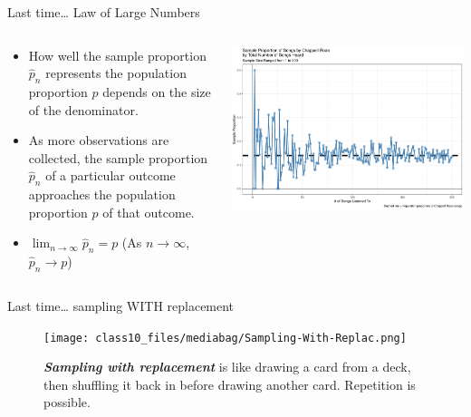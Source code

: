 \documentclass[
  ignorenonframetext,
]{beamer}
\begin{document}
\begin{frame}{Last time\ldots{} Law of Large Numbers}
\label{last-time-law-of-large-numbers}
\begin{columns}[T]
\begin{column}{0.48\textwidth}
\begin{itemize}
\item
  How well the sample proportion \(\hat{p}_n\) represents the population
  proportion \(p\) depends on the size of the denominator.
\item
  As more observations are collected, the sample proportion
  \(\hat{p}_n\) of a particular outcome approaches the population
  proportion \(p\) of that outcome.
\item
  \(\lim_{n\to\infty} \hat{p}_n = p\) (As \(n \to \infty\),
  \(\hat{p}_n \to p\))
\end{itemize}
\end{column}

\begin{column}{0.48\textwidth}
\includegraphics{class10_files/figure-beamer/unnamed-chunk-2-1.pdf}
\end{column}
\end{columns}
\end{frame}

\begin{frame}{Last time\ldots{} sampling WITH replacement}
\label{last-time-sampling-with-replacement}
\begin{figure}[H]

{\centering \texttt{[image: class10\_files/mediabag/Sampling-With-Replac.png]}

}

\caption{\textbf{\emph{Sampling with replacement}} is like drawing a
card from a deck, then shuffling it back in before drawing another card.
Repetition is possible.}

\end{figure}%
\end{frame}
\end{document}
